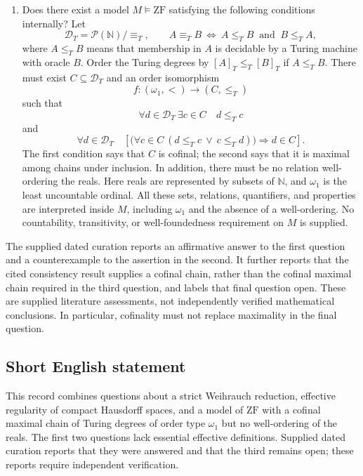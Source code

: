 \documentclass[11pt]{article}
\newcommand{\N}{\mathbb{N}}
\begin{document}
\begin{enumerate}
\item Does there exist a model \(M\models\mathrm{ZF}\) satisfying the following conditions internally? Let
\[
\mathcal D_T=\mathcal P(\N)/{\equiv_T},
\qquad
A\equiv_T B\ \Longleftrightarrow\ A\leq_T B\ \text{ and }\ B\leq_T A,
\]
where \(A\leq_T B\) means that membership in \(A\) is decidable by a Turing machine with oracle \(B\). Order the Turing degrees by \([A]_T\leq_T[B]_T\) if \(A\leq_T B\). There must exist \(C\subseteq\mathcal D_T\) and an order isomorphism
\[
f:(\omega_1,<)\longrightarrow(C,\leq_T)
\]
such that
\[
\forall d\in\mathcal D_T\ \exists c\in C\quad d\leq_T c
\]
and
\[
\forall d\in\mathcal D_T\quad
\left[\bigl(\forall c\in C\ (d\leq_T c\ \lor\ c\leq_T d)\bigr)
\Longrightarrow d\in C\right].
\]
The first condition says that \(C\) is cofinal; the second says that it is maximal among chains under inclusion. In addition, there must be no relation well-ordering the reals. Here reals are represented by subsets of \(\N\), and \(\omega_1\) is the least uncountable ordinal. All these sets, relations, quantifiers, and properties are interpreted inside \(M\), including \(\omega_1\) and the absence of a well-ordering. No countability, transitivity, or well-foundedness requirement on \(M\) is supplied.
\end{enumerate}

The supplied dated curation reports an affirmative answer to the first question and a counterexample to the assertion in the second. It further reports that the cited consistency result supplies a cofinal chain, rather than the cofinal maximal chain required in the third question, and labels that final question open. These are supplied literature assessments, not independently verified mathematical conclusions. In particular, cofinality must not replace maximality in the final question.
\subsection{Short English statement}
This record combines questions about a strict Weihrauch reduction, effective regularity of compact Hausdorff spaces, and a model of \(\mathrm{ZF}\) with a cofinal maximal chain of Turing degrees of order type \(\omega_1\) but no well-ordering of the reals. The first two questions lack essential effective definitions. Supplied dated curation reports that they were answered and that the third remains open; these reports require independent verification.
\end{document}
